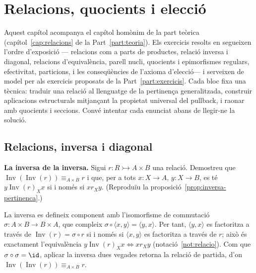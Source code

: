 \chapter{Relacions, quocients i elecció}\label{cap:practica-relacions}

Aquest capítol acompanya el capítol homònim de la part teòrica (capítol~\ref{cap:relacions} de la Part~\ref{part:teoria}). Els exercicis resolts en segueixen l'ordre d'exposició --- relacions com a parts de productes, relació inversa i diagonal, relacions d'equivalència, parell nucli, quocients i epimorfismes regulars, efectivitat, particions, i les conseqüències de l'axioma d'elecció--- i serveixen de model per als exercicis proposats de la Part~\ref{part:exercicis}. Cada bloc fixa una tècnica: traduir una relació al llenguatge de la pertinença generalitzada, construir aplicacions estructurals mitjançant la propietat universal del pullback, i raonar amb quocients i seccions. Convé intentar cada enunciat abans de llegir-ne la solució.

\section{Relacions, inversa i diagonal}\label{prac:relacions}

\begin{exercici}
\textbf{La inversa de la inversa.} Sigui \(r\colon R\rightarrowtail A\times B\) una relació. Demostreu que \(\operatorname{Inv}(\operatorname{Inv}(r))\equiv_{A\times B}r\) i que, per a tots \(x\colon X\to A\), \(y\colon X\to B\), es té \(y\mathrel{\operatorname{Inv}(r)_X}x\) si i només si \(x\mathrel{r_X}y\). (Reproduïu la proposició~\ref{prop:inversa-pertinenca}.)
\end{exercici}
\begin{solucio}
La inversa es defineix component amb l'isomorfisme de commutació \(\sigma\colon A\times B\to B\times A\), que compleix \(\sigma\circ\langle x,y\rangle=\langle y,x\rangle\). Per tant, \(\langle y,x\rangle\) es factoritza a través de \(\operatorname{Inv}(r)=\sigma\circ r\) si i només si \(\langle x,y\rangle\) es factoritza a través de \(r\); això és exactament l'equivalència \(y\mathrel{\operatorname{Inv}(r)_X}x\iff x\mathrel{r_X}y\) (notació~\ref{not:relacio}). Com que \(\sigma\circ\sigma=\id\), aplicar la inversa dues vegades retorna la relació de partida, d'on \(\operatorname{Inv}(\operatorname{Inv}(r))\equiv_{A\times B}r\).
\end{solucio}

